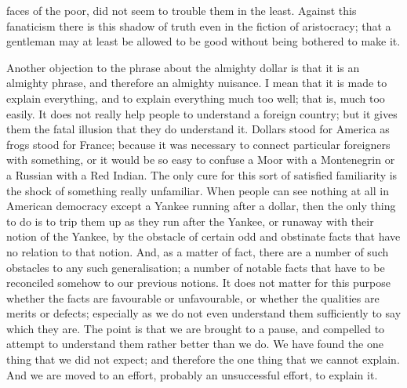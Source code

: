 \documentclass{book}
\begin{document}
faces of the poor, did not seem to trouble them in the least. Against this fanaticism there is this shadow of truth even in the fiction of aristocracy; that a gentleman may at least be allowed to be good without being bothered to make it.

Another objection to the phrase about the almighty dollar is that it is an almighty phrase, and therefore an almighty nuisance. I mean that it is made to explain everything, and to explain everything much too well; that is, much too easily. It does not really help people to understand a foreign country; but it gives them the fatal illusion that they do understand it. Dollars stood for America as frogs stood for France; because it was necessary to connect particular foreigners with something, or it would be so easy to confuse a Moor with a Montenegrin or a Russian with a Red Indian. The only cure for this sort of satisfied familiarity is the shock of something really unfamiliar. When people can see nothing at all in American democracy except a Yankee running after a dollar, then the only thing to do is to trip them up as they run after the Yankee, or runaway with their notion of the Yankee, by the obstacle of certain odd and obstinate facts that have no relation to that notion. And, as a matter of fact, there are a number of such obstacles to any such generalisation; a number of notable facts that have to be reconciled somehow to our previous notions. It does not matter for this purpose whether the facts are favourable or unfavourable, or whether the qualities are merits or defects; especially as we do not even understand them sufficiently to say which they are. The point is that we are brought to a pause, and compelled to attempt to understand them rather better than we do. We have found the one thing that we did not expect; and therefore the one thing that we cannot explain. And we are moved to an effort, probably an unsuccessful effort, to explain it.
\end{document}
